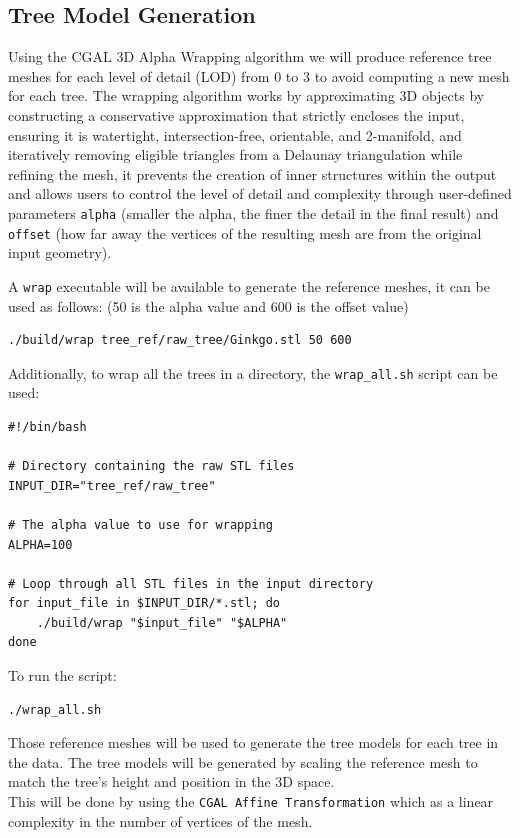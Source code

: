 \documentclass[12pt]{article}
\begin{document}
\subsection{Tree Model Generation}
Using the CGAL 3D Alpha Wrapping \cite{cgal_alpha_wrapper} algorithm we will produce
reference tree meshes for each level of detail (LOD) from 0 to 3 to avoid computing
a new mesh for each tree.
The wrapping algorithm  works by
approximating 3D objects by constructing a
conservative approximation that strictly encloses the input, ensuring it is watertight, 
intersection-free, orientable, and 2-manifold, and iteratively removing eligible 
triangles from a Delaunay triangulation while refining the mesh, it prevents 
the creation of inner structures within the output and allows users to control 
the level of detail and complexity through user-defined parameters \texttt{alpha} 
(smaller the alpha, the finer the detail in the final result) and \texttt{offset} 
(how far away the vertices of the resulting mesh are from the original input geometry).

A \texttt{wrap} executable will be available to generate the reference meshes, it 
can be used as follows:
(50 is the alpha value and 600 is the offset value)

\begin{lstlisting}
./build/wrap tree_ref/raw_tree/Ginkgo.stl 50 600
\end{lstlisting}


Additionally, to wrap all the trees in a directory, the \texttt{wrap\_all.sh} script
can be used:

\begin{lstlisting}
#!/bin/bash

# Directory containing the raw STL files
INPUT_DIR="tree_ref/raw_tree"

# The alpha value to use for wrapping
ALPHA=100

# Loop through all STL files in the input directory
for input_file in $INPUT_DIR/*.stl; do
	./build/wrap "$input_file" "$ALPHA"
done
\end{lstlisting}

To run the script:
\begin{lstlisting}
./wrap_all.sh
\end{lstlisting}

   Those reference meshes will be used to generate the tree models for each tree 
in the data. The tree models will be generated by scaling the reference mesh 
to match the tree's height and position in the 3D space. \\
This will be done by using the \texttt{CGAL Affine Transformation} \cite{cgal_affine_transformation}
which as a linear complexity in the number of vertices of the mesh.
\end{document}
